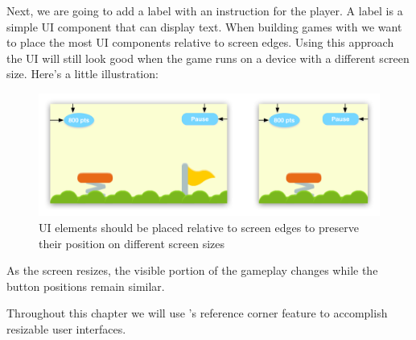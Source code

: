 Next, we are going to add a label with an instruction for the player. A label is
a simple UI component that can display text. When building games with \cocos{}
we want to place the most UI components relative to screen edges. Using this
approach the UI will still look good when the game runs on a device with a
different screen size. Here's a little illustration:

\begin{figure}[H]
		\centering
		\includegraphics[width=0.7\linewidth]{images/Chapter6/multiple_screen_sizes.png}
		\caption{UI elements should be placed relative to screen edges to preserve
		their position on different screen sizes}
\end{figure}

As the screen resizes, the visible portion of the gameplay changes while the
button positions remain similar.

Throughout this chapter we will use \cocos{}'s reference
corner feature to accomplish resizable user interfaces. 

